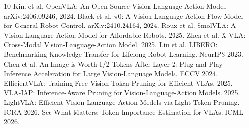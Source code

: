 \documentclass[letterpaper]{article}
\begin{document}

\begin{thebibliography}{10}
 Kim et al. OpenVLA: An Open-Source Vision-Language-Action Model. arXiv:2406.09246, 2024.
 Black et al. $\pi$0: A Vision-Language-Action Flow Model for General Robot Control. arXiv:2410.24164, 2024.
 Roux et al. SmolVLA: A Vision-Language-Action Model for Affordable Robots. 2025.
 Zhen et al. X-VLA: Cross-Modal Vision-Language-Action Model. 2025.
 Liu et al. LIBERO: Benchmarking Knowledge Transfer for Lifelong Robot Learning. NeurIPS 2023.
 Chen et al. An Image is Worth 1/2 Tokens After Layer 2: Plug-and-Play Inference Acceleration for Large Vision-Language Models. ECCV 2024.
 EfficientVLA: Training-Free Vision Token Pruning for Efficient VLAs. 2025.
 VLA-IAP: Inference-Aware Pruning for Vision-Language-Action Models. 2025.
 LightVLA: Efficient Vision-Language-Action Models via Light Token Pruning. ICRA 2026.
 See What Matters: Token Importance Estimation for VLAs. ICML 2026.
\end{thebibliography}
\end{document}
